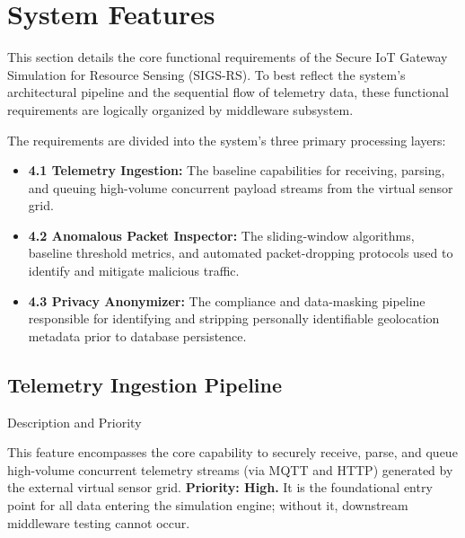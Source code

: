 \documentclass[12pt,letterpaper]{article}
\begin{document}
\section{System Features}
This section details the core functional requirements of the Secure IoT Gateway Simulation for Resource Sensing (SIGS-RS). To best reflect the system's architectural pipeline and the sequential flow of telemetry data, these functional requirements are logically organized by middleware subsystem. 

The requirements are divided into the system's three primary processing layers:
\begin{itemize}
\item \textbf{4.1 Telemetry Ingestion:} The baseline capabilities for receiving, parsing, and queuing high-volume concurrent payload streams from the virtual sensor grid.
\item \textbf{4.2 Anomalous Packet Inspector:} The sliding-window algorithms, baseline threshold metrics, and automated packet-dropping protocols used to identify and mitigate malicious traffic.
\item \textbf{4.3 Privacy Anonymizer:} The compliance and data-masking pipeline responsible for identifying and stripping personally identifiable geolocation metadata prior to database persistence.
\end{itemize}
\subsection{Telemetry Ingestion Pipeline}

\par\vspace{0.083in}\noindent\hspace*{0.44in}Description and Priority\par\vspace{0.083in}
\begin{list}{}{\setlength{\leftmargin}{0.94in}\setlength{\rightmargin}{0pt}}\item[]
This feature encompasses the core capability to securely receive, parse, and queue high-volume concurrent telemetry streams (via MQTT and HTTP) generated by the external virtual sensor grid. \textbf{Priority: High.} It is the foundational entry point for all data entering the simulation engine; without it, downstream middleware testing cannot occur.
\end{list}
\end{document}
